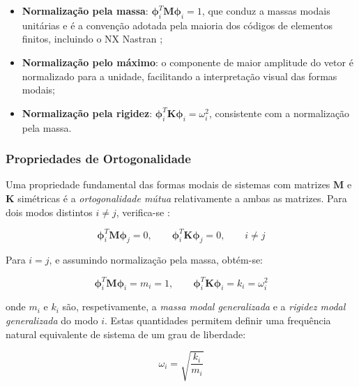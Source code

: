 \documentclass[a4paper,fleqn]{cas-sc}
\begin{document}
\begin{itemize}
    \item \textbf{Normalização pela massa}: $\boldsymbol{\phi}_i^T \mathbf{M} \boldsymbol{\phi}_i = 1$, que conduz a massas modais unitárias e é a convenção adotada pela maioria dos códigos de elementos finitos, incluindo o NX Nastran \cite{Nastran2014};
    
    \item \textbf{Normalização pelo máximo}: o componente de maior amplitude do vetor é normalizado para a unidade, facilitando a interpretação visual das formas modais;
    
    \item \textbf{Normalização pela rigidez}: $\boldsymbol{\phi}_i^T \mathbf{K} \boldsymbol{\phi}_i = \omega_i^2$, consistente com a normalização pela massa.
\end{itemize}

\subsubsection{Propriedades de Ortogonalidade}

Uma propriedade fundamental das formas modais de sistemas com matrizes $\mathbf{M}$ e $\mathbf{K}$ simétricas é a \textit{ortogonalidade mútua} relativamente a ambas as matrizes. Para dois modos distintos $i \neq j$, verifica-se \cite{Clough1993, Inman2014}:

\begin{equation}
    \boldsymbol{\phi}_i^T \mathbf{M} \boldsymbol{\phi}_j = 0, \qquad 
    \boldsymbol{\phi}_i^T \mathbf{K} \boldsymbol{\phi}_j = 0, \qquad 
    i \neq j
    \label{eq:ortogonalidade}
\end{equation}

Para $i = j$, e assumindo normalização pela massa, obtém-se:

\begin{equation}
    \boldsymbol{\phi}_i^T \mathbf{M} \boldsymbol{\phi}_i = m_i = 1, 
    \qquad
    \boldsymbol{\phi}_i^T \mathbf{K} \boldsymbol{\phi}_i = k_i = 
    \omega_i^2
    \label{eq:massas_rigidezes_modais}
\end{equation}

\noindent onde $m_i$ e $k_i$ são, respetivamente, a \textit{massa modal generalizada} e a \textit{rigidez modal generalizada} do modo $i$. Estas quantidades permitem definir uma frequência natural equivalente de sistema de um grau de liberdade:

\begin{equation}
    \omega_i = \sqrt{\frac{k_i}{m_i}}
    \label{eq:omega_sdof}
\end{equation}
\end{document}
